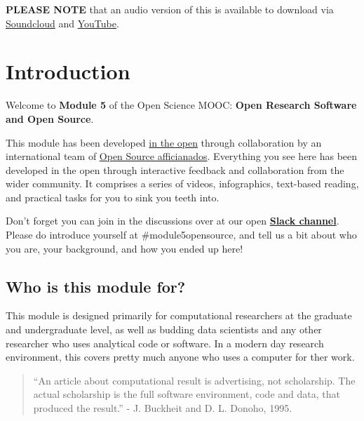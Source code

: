 \documentclass[]{book}
\begin{document}
\textbf{PLEASE NOTE} that an audio version of this is available to download via \href{https://soundcloud.com/open-science-mooc/module-5-open-source-and-open-research-software}{Soundcloud} and \href{https://www.youtube.com/watch?v=BHrOEmKk5zM}{YouTube}.

\hypertarget{introduction-1}{%
\section{Introduction }\label{introduction-1}}

Welcome to \textbf{Module 5} of the Open Science MOOC: \textbf{Open Research Software and Open Source}.

This module has been developed \href{https://github.com/OpenScienceMOOC/Module-5-Open-Research-Software-and-Open-Source}{in the open} through collaboration by an international team of \href{https://github.com/OpenScienceMOOC/Module-5-Open-Research-Software-and-Open-Source/blob/master/README.md\#development-team-}{Open Source afficianados}. Everything you see here has been developed in the open through interactive feedback and collaboration from the wider community. It comprises a series of videos, infographics, text-based reading, and practical tasks for you to sink you teeth into.

Don't forget you can join in the discussions over at our open \href{https://osmooc.herokuapp.com/}{\textbf{Slack channel}}. Please do introduce yourself at \#module5opensource, and tell us a bit about who you are, your background, and how you ended up here!

\hypertarget{who-is-this-module-for-1}{%
\subsection{Who is this module for?}\label{who-is-this-module-for-1}}

This module is designed primarily for computational researchers at the graduate and undergraduate level, as well as budding data scientists and any other researcher who uses analytical code or software. In a modern day research environment, this covers pretty much anyone who uses a computer for ther work.

\begin{quote}
``An article about computational result is advertising, not scholarship. The actual scholarship is the full software environment, code and data, that produced the result.'' - J. Buckheit and D. L. Donoho, 1995.
\end{quote}
\end{document}
